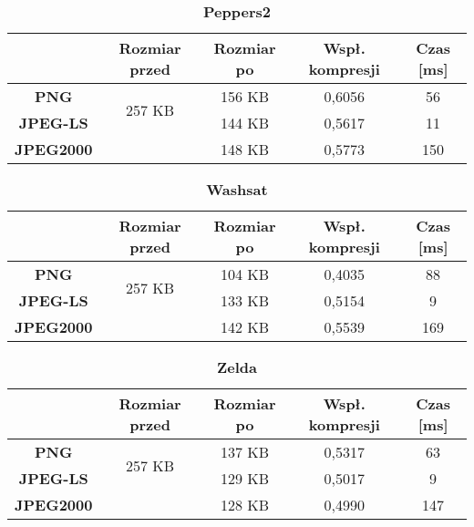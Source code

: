 \begin{table}[!h]
	\centering
	\caption{\textbf{Peppers2}}
	\label{my-label}
	\begin{tabular}{|c|c|c|c|c|}                                             
		\hline
		& \textbf{Rozmiar przed} & \textbf{Rozmiar po} & \textbf{Wspł. kompresji} & \textbf{Czas {[}ms{]}} \\ \hline 
		\textbf{PNG}      &          \multicolumn{1}{c|}{\multirow{2}{*}{257 KB}}             &      156 KB               &     0,6056                     &          56                   \\\cline{3-5}
		\textbf{JPEG-LS}  &                        &       144 KB              &       0,5617                   &             11             \\\cline{3-5}
		\textbf{JPEG2000} &                        &       148 KB              &       0,5773                   &        150              \\ \hline
	\end{tabular}
\end{table}

\begin{table}[!h]
	\centering
	\caption{\textbf{Washsat}}
	\label{my-label}
	\begin{tabular}{|c|c|c|c|c|}                                             
		\hline
		& \textbf{Rozmiar przed} & \textbf{Rozmiar po} & \textbf{Wspł. kompresji} & \textbf{Czas {[}ms{]}} \\ \hline 
		\textbf{PNG}      &          \multicolumn{1}{c|}{\multirow{2}{*}{257 KB}}             &         104 KB            &     0,4035                     &          88                   \\\cline{3-5}
		\textbf{JPEG-LS}  &                        &      133 KB               &          0,5154                &           9               \\\cline{3-5}
		\textbf{JPEG2000} &                        &      142 KB               &          0,5539                &     169                 \\ \hline
	\end{tabular}
\end{table}

\begin{table}[!h]
	\centering
	\caption{\textbf{Zelda}}
	\label{my-label}
	\begin{tabular}{|c|c|c|c|c|}                                             
		\hline
		& \textbf{Rozmiar przed} & \textbf{Rozmiar po} & \textbf{Wspł. kompresji} & \textbf{Czas {[}ms{]}} \\ \hline 
		\textbf{PNG}      &          \multicolumn{1}{c|}{\multirow{2}{*}{257 KB}}             &      137 KB               &     0,5317                     &          63                   \\\cline{3-5}
		\textbf{JPEG-LS}  &                        &      129 KB               &       0,5017                   &         9                 \\\cline{3-5}
		\textbf{JPEG2000} &                        &      128 KB               &       0,4990                   &        147              \\ \hline
	\end{tabular}
\end{table}
